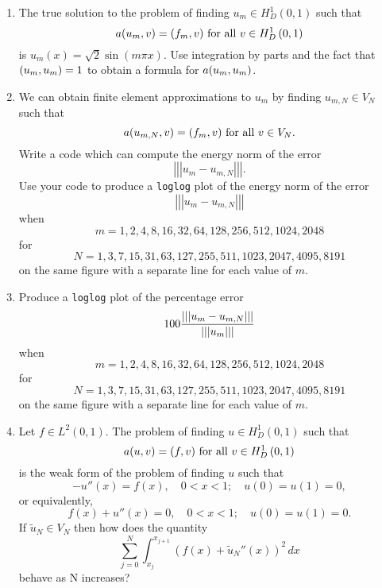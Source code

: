 \begin{enumerate}
\item The true solution to the problem of finding $u_m\in H^1_D\left(0,1\right)$ such that
\[
a(u_m,v)=(f_m,v)\mbox{ for all }v\in H^1_D\left(0,1\right)
\]
is $u_m(x)=\sqrt{2}\sin(m\pi x)$. Use integration by parts and the fact that $(u_m,u_m)=1$ to obtain a formula for $a(u_m,u_m)$.
\\
\item We can obtain finite element approximations to $u_m$ by finding $u_{m,N}\in V_N$ such that
\[
a(u_{m,N},v)=(f_m,v)\mbox{ for all }v\in V_N.
\]
Write a code which can compute the energy norm of the error
\[
\left|\left|\left|u_m-u_{m,N}\right|\right|\right|.
\]
Use your code to produce a \verb|loglog| plot of the energy norm of the error
\[
\left|\left|\left|u_m-u_{m,N}\right|\right|\right|
\]
when
\[
m=1,2,4,8,16,32,64,128,256,512,1024,2048
\]
for
\[
N=1,3,7,15,31,63,127,255,511,1023,2047,4095,8191
\]
on the same figure with a separate line for each value of $m$.
\\
\item Produce a \verb|loglog| plot of the percentage error
\[
100{\left|\left|\left|u_m-u_{m,N}\right|\right|\right| \over \left|\left|\left|u_m\right|\right|\right|}
\]
when
\[
m=1,2,4,8,16,32,64,128,256,512,1024,2048
\]
for
\[
N=1,3,7,15,31,63,127,255,511,1023,2047,4095,8191
\]
on the same figure with a separate line for each value of $m$.
\\
\item Let $f\in L^2\left(0,1\right)$. The problem of finding $u\in H^1_D\left(0,1\right)$ such that
\[
a(u,v)=(f,v)\mbox{ for all }v\in H^1_D\left(0,1\right)
\]
is the weak form of the problem of finding $u$ such that
\[
-u''(x)=f(x),\quad0<x<1;\quad u(0)=u(1)=0,
\]
or equivalently,
\[
f(x)+u''(x)=0,\quad0<x<1;\quad u(0)=u(1)=0.
\]
If $\tilde{u}_N\in V_N$ then how does the quantity
\[
\sum_{j=0}^N\int_{x_j}^{x_{j+1}}(f(x)+\tilde{u}_N''(x))^2\,dx
\]
behave as N increases?


\end{enumerate}

           

